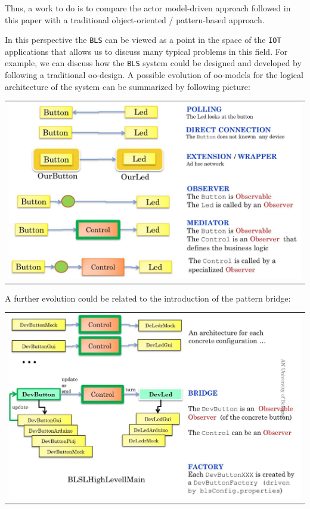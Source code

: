 Thus, a work to do is to compare the actor model-driven approach followed in this paper with a traditional object-oriented / pattern-based approach.

In this perspective the \texttt{BLS} can be viewed as a point in the space of the \texttt{IOT} applications that allows us to discuss many typical problems in this field. For example, we can discuss how the \texttt{BLS} system could be designed and developed by following a traditional oo-design. A possible evolution of oo-models for the logical architecture of the system can be summarized by following picture:


\begin{center}
\begin{tabular}{ c }
     \includegraphics[scale = 0.45]{img/blsInteraction0.jpg}\\
\end{tabular}{   }
\end{center}

A further evolution could be related to the introduction of the pattern bridge:

\begin{center}
\begin{tabular}{ c }
     \includegraphics[scale = 0.45]{img/blsInteraction1.jpg}\\
\end{tabular}{   }
\end{center}


